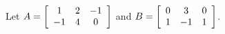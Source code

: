 \documentclass{ximera}
\author{Zack Reed}
\begin{document}
\begin{exercise}
  Let $A = \startmat{ccc}
    1 & 2 & -1 \\
    -1 & 4 & 0 \\
  \stopmat$ and
  $B = \startmat{ccc}
    0 & 3 & 0 \\
    1 & -1 & 1 \\
  \stopmat$.

  
\end{exercise}
\end{document}
